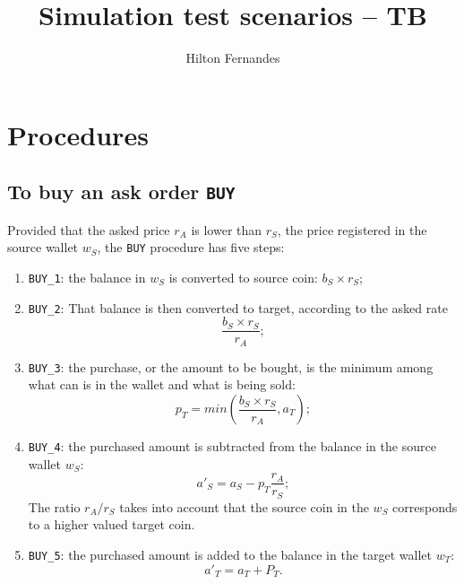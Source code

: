 \documentclass[a4paper,11pt]{article}
\author{Hilton Fernandes}
\title{Simulation test scenarios -- TB}
\begin{document}
\maketitle

\tableofcontents

\pagebreak

\section{Procedures}

\subsection{To buy an ask order {\tt BUY}}

Provided that the asked price $r_A$ is lower than $r_S$, the price registered in the 
source wallet $w_S$, the {\tt BUY} procedure has five steps:
\begin{enumerate}
    \item \label{itm:BUY-1} {\tt BUY\_1}: 
	the balance in $w_S$ is converted to source coin: $b_S \times r_S$;
	
    \item \label{itm:BUY-2} {\tt BUY\_2}: 
	That balance is then converted to target, according to the asked rate 
	\begin{equation*}
	    \frac{b_S \times r_S}{r_A}; 
	\end{equation*}
	
    \item \label{itm:BUY-3} {\tt BUY\_3}: 
	the purchase, or the amount to be bought, is the minimum among what can is in 
	the wallet and what is being sold:
	\begin{equation*}
	    p_T = min \left( \frac{b_S \times r_S}{r_A}, a_T \right); 
	\end{equation*}
	
    \item \label{itm:BUY-4} {\tt BUY\_4}:
	the purchased amount is subtracted from the balance in the source wallet $w_S$:
	\begin{equation*}
	    a'_S = a_S - p_T \frac{r_A}{r_S};
	\end{equation*}
	The ratio $r_A / r_S$ takes into account that the source coin in the $w_S$ corresponds
	to a higher valued target coin.
	
    \item \label{itm:BUY-5} {\tt BUY\_5}:
	the purchased amount is added to the balance in the target wallet $w_T$:
	\begin{equation*}
	    a'_T = a_T + P_T.
	\end{equation*}
	
\end{enumerate}
\end{document}
